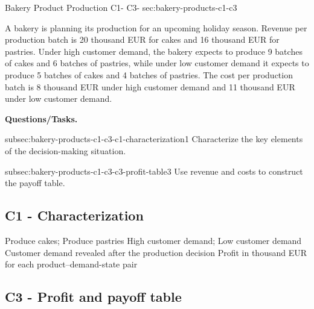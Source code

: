 	\sectionScored
	{Bakery Product Production}
	{C1- \hspace{2mm} C3-}
	{sec:bakery-products-c1-c3}
	{
		A bakery is planning its production for an upcoming holiday season. Revenue per production batch is 20 thousand EUR for cakes and
		16 thousand EUR for pastries. Under high customer demand, the
		bakery expects to produce 9 batches of cakes and 6 batches of pastries, while
		under low customer demand it expects to produce 5 batches of
		cakes and 4 batches of pastries. The cost per production batch is 8 thousand
		EUR under high customer demand and 11 thousand EUR under low
		customer demand.
		
			\textbf{Questions/Tasks.}
		\begin{enumerate}
			\CriterionTask
			{subsec:bakery-products-c1-c3-c1-characterization}{1}
			{Characterize the key elements of the decision-making situation. }
			
			\CriterionTask
			{subsec:bakery-products-c1-c3-c3-profit-table}{3}
			{Use revenue and costs to construct the payoff table. }
		\end{enumerate}
		
		\label{subsec:bakery-products-c1-c3-c1-characterization}
		\subsection*{C1 - Characterization }
		
		\DecisionElementsTable
		{Produce cakes; Produce pastries}
		{High customer demand; Low customer demand}
		{Customer demand revealed after the production decision}
		{Profit in thousand EUR for each product--demand-state pair}
		
		\label{subsec:bakery-products-c1-c3-c3-profit-table}
		\subsection*{C3 - Profit and payoff table }
		
		
}
